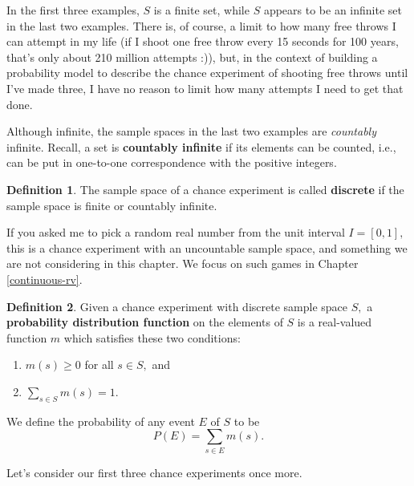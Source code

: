 \documentclass[
]{book}
\providecommand{\tightlist}{%
  \setlength{\itemsep}{0pt}\setlength{\parskip}{0pt}}
\theoremstyle{definition}
\newtheorem{definition}{Definition}[chapter]
\theoremstyle{definition}
\theoremstyle{definition}
\theoremstyle{definition}
\theoremstyle{remark}
\begin{document}
In the first three examples, \(S\) is a finite set, while \(S\) appears to be an infinite set in the last two examples. There is, of course, a limit to how many free throws I can attempt in my life (if I shoot one free throw every 15 seconds for 100 years, that's only about 210 million attempts :)), but, in the context of building a probability model to describe the chance experiment of shooting free throws until I've made three, I have no reason to limit how many attempts I need to get that done.

Although infinite, the sample spaces in the last two examples are \emph{countably} infinite. Recall, a set is \textbf{countably infinite} if its elements can be counted, i.e., can be put in one-to-one correspondence with the positive integers.

\begin{definition}
\protect\hypertarget{def:discrete-sample-space}{}\label{def:discrete-sample-space}The sample space of a chance experiment is called \textbf{discrete} if the sample space is finite or countably infinite.
\end{definition}

If you asked me to pick a random real number from the unit interval \(I = [0,1],\) this is a chance experiment with an uncountable sample space, and something we are not considering in this chapter. We focus on such games in Chapter \ref{continuous-rv}.

\begin{definition}
\protect\hypertarget{def:probability-distribution-function}{}\label{def:probability-distribution-function}Given a chance experiment with discrete sample space \(S,\) a \textbf{probability distribution function} on the elements of \(S\) is a real-valued function \(m\) which satisfies these two conditions:

\begin{enumerate}
\def\labelenumi{\arabic{enumi}.}
\tightlist
\item
  \(m(s) \geq 0\) for all \(s \in S,\) and
\item
  \(\displaystyle \sum_{s \in S} m(s) = 1.\)
\end{enumerate}

We define the probability of any event \(E\) of \(S\) to be \[P(E) = \sum_{s \in E} m(s).\]
\end{definition}

Let's consider our first three chance experiments once more.
\end{document}
